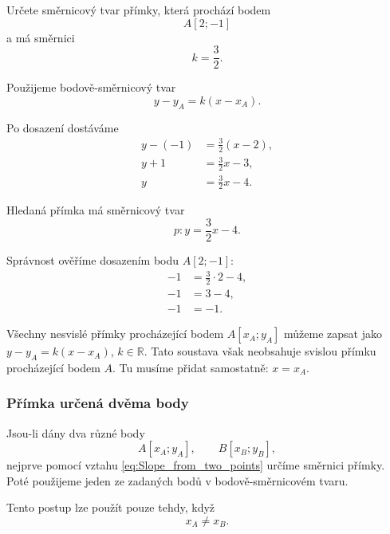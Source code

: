 \begin{example}\label{exa:Line_from_point_and_slope}
    Určete směrnicový tvar přímky, která prochází bodem
    \[
        A[2;-1]
    \]
    a má směrnici
    \[
        k=\frac{3}{2}.
    \]

    Použijeme bodově-směrnicový tvar
    \[
        y-y_A=k(x-x_A).
    \]

    Po dosazení dostáváme
    \begin{align*}
        y-(-1)
        &=
        \frac{3}{2}(x-2),\\
        y+1
        &=
        \frac{3}{2}x-3,\\
        y
        &=
        \frac{3}{2}x-4.
    \end{align*}

    Hledaná přímka má směrnicový tvar
    \[
        p:y=\frac{3}{2}x-4.
    \]

    Správnost ověříme dosazením bodu $A[2;-1]$:
    \begin{align*}
        -1 &= \frac{3}{2} \cdot 2 - 4, \\
        -1 &= 3 - 4, \\
        -1 &= -1.  
    \end{align*}
\end{example}

\begin{remark}\label{rem:All_lines_through_point_slope}
    Všechny nesvislé přímky procházející bodem $A[x_A;y_A]$
    můžeme zapsat jako $y-y_A=k(x-x_A)$, $k\in\mathbb{R}$.
    Tato soustava však neobsahuje svislou přímku procházející bodem
    $A$. Tu musíme přidat samostatně: $x=x_A$.
\end{remark}

\subsubsection{Přímka určená dvěma body}
\label{subsubsec:Slope_intercept_line_from_two_points}

Jsou-li dány dva různé body
\[
    A[x_A;y_A],
    \qquad
    B[x_B;y_B],
\]
nejprve pomocí vztahu \eqref{eq:Slope_from_two_points} určíme směrnici
přímky. Poté použijeme jeden ze zadaných bodů v bodově-směrnicovém
tvaru.

Tento postup lze použít pouze tehdy, když
\[
    x_A\neq x_B.
\]

